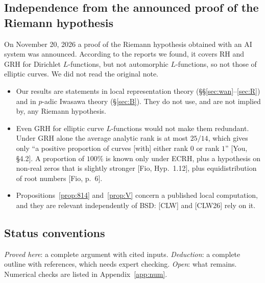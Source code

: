 \documentclass[11pt]{amsart}
\theoremstyle{definition}
\theoremstyle{remark}
\begin{document}
\subsection{Independence from the announced proof of the Riemann hypothesis}
On November 20, 2026 a proof of the Riemann hypothesis obtained with an AI system was announced. According to the reports we found, it covers RH and GRH for Dirichlet $L$-functions, but not automorphic $L$-functions, so not those of elliptic curves. We did not read the original note.
\begin{itemize}
\item Our results are statements in local representation theory (\S\S\ref{sec:wan}--\ref{sec:R}) and in $p$-adic Iwasawa theory (\S\ref{sec:B}). They do not use, and are not implied by, any Riemann hypothesis.
\item Even GRH for elliptic curve $L$-functions would not make them redundant. Under GRH alone the average analytic rank is at most $25/14$, which gives only ``a positive proportion of curves [with] either rank $0$ or rank $1$'' [You, \S4.2]. A proportion of $100\%$ is known only under ECRH, plus a hypothesis on non-real zeros that is slightly stronger [Fio, Hyp.~1.12], plus equidistribution of root numbers [Fio, p.~6].
\item Propositions~\ref{prop:814} and~\ref{prop:V} concern a published local computation, and they are relevant independently of BSD: [CLW] and [CLW26] rely on it.
\end{itemize}

\subsection{Status conventions}
\emph{Proved here}: a complete argument with cited inputs. \emph{Deduction}: a complete outline with references, which needs expert checking. \emph{Open}: what remains. Numerical checks are listed in Appendix~\ref{app:num}.

\end{document}

